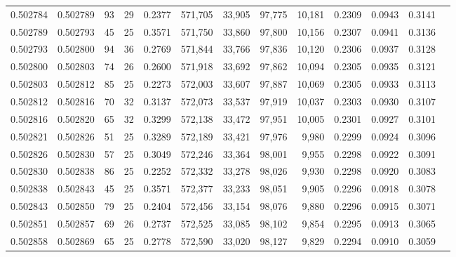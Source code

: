 \begin{tabular}{rrrrrrrrrrrrr}
0.502784 & 0.502789 &  93 &  29 &                                     0.2377 & 571,705 &  33,905 &  97,775 &  10,181 & 0.2309 & 0.0943 & 0.3141 \\
0.502789 & 0.502793 &  45 &  25 &                                     0.3571 & 571,750 &  33,860 &  97,800 &  10,156 & 0.2307 & 0.0941 & 0.3136 \\
0.502793 & 0.502800 &  94 &  36 &                                     0.2769 & 571,844 &  33,766 &  97,836 &  10,120 & 0.2306 & 0.0937 & 0.3128 \\
0.502800 & 0.502803 &  74 &  26 &                                     0.2600 & 571,918 &  33,692 &  97,862 &  10,094 & 0.2305 & 0.0935 & 0.3121 \\
0.502803 & 0.502812 &  85 &  25 &                                     0.2273 & 572,003 &  33,607 &  97,887 &  10,069 & 0.2305 & 0.0933 & 0.3113 \\
0.502812 & 0.502816 &  70 &  32 &                                     0.3137 & 572,073 &  33,537 &  97,919 &  10,037 & 0.2303 & 0.0930 & 0.3107 \\
0.502816 & 0.502820 &  65 &  32 &                                     0.3299 & 572,138 &  33,472 &  97,951 &  10,005 & 0.2301 & 0.0927 & 0.3101 \\
0.502821 & 0.502826 &  51 &  25 &                                     0.3289 & 572,189 &  33,421 &  97,976 &   9,980 & 0.2299 & 0.0924 & 0.3096 \\
0.502826 & 0.502830 &  57 &  25 &                                     0.3049 & 572,246 &  33,364 &  98,001 &   9,955 & 0.2298 & 0.0922 & 0.3091 \\
0.502830 & 0.502838 &  86 &  25 &                                     0.2252 & 572,332 &  33,278 &  98,026 &   9,930 & 0.2298 & 0.0920 & 0.3083 \\
0.502838 & 0.502843 &  45 &  25 &                                     0.3571 & 572,377 &  33,233 &  98,051 &   9,905 & 0.2296 & 0.0918 & 0.3078 \\
0.502843 & 0.502850 &  79 &  25 &                                     0.2404 & 572,456 &  33,154 &  98,076 &   9,880 & 0.2296 & 0.0915 & 0.3071 \\
0.502851 & 0.502857 &  69 &  26 &                                     0.2737 & 572,525 &  33,085 &  98,102 &   9,854 & 0.2295 & 0.0913 & 0.3065 \\
0.502858 & 0.502869 &  65 &  25 &                                     0.2778 & 572,590 &  33,020 &  98,127 &   9,829 & 0.2294 & 0.0910 & 0.3059 \\

\end{tabular}
